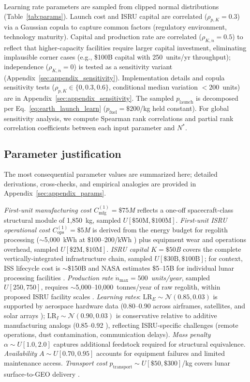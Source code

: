 \documentclass[preprint,12pt]{elsarticle}
\begin{document}
Learning rate parameters are sampled from clipped normal distributions (Table~\ref{tab:params}). Launch cost and ISRU capital are correlated ($\rho_{p,K} = 0.3$) via a Gaussian copula to capture common factors (regulatory environment, technology maturity). Capital and production rate are correlated ($\rho_{K,\dot{n}} = 0.5$) to reflect that higher-capacity facilities require larger capital investment, eliminating implausible corner cases (e.g., \$100B capital with 250~units/yr throughput); independence ($\rho_{K,\dot{n}} = 0$) is tested as a sensitivity variant (Appendix~\ref{sec:appendix_sensitivity}). Implementation details and copula sensitivity tests ($\rho_{p,K} \in \{0, 0.3, 0.6\}$, conditional median variation $<$200~units) are in Appendix~\ref{sec:appendix_sensitivity}. The sampled $p_{\mathrm{launch}}$ is decomposed per Eq.~\ref{eq:earth_launch_learn} ($p_{\mathrm{fuel}} = \$200$/kg held constant). For global sensitivity analysis, we compute Spearman rank correlations and partial rank correlation coefficients between each input parameter and $N^*$.

\subsection{Parameter justification}
\label{sec:param_justification}

The most consequential parameter values are summarized here; detailed derivations, cross-checks, and empirical analogies are provided in Appendix~\ref{sec:appendix_params}.

\emph{First-unit manufacturing cost $C_{\mathrm{mfg}}^{(1)} = \$75$M} reflects a one-off spacecraft-class structural module of 1{,}850~kg, sampled $U[\$50\text{M}, \$100\text{M}]$. \emph{First-unit ISRU operational cost $C_{\mathrm{ops}}^{(1)} = \$5$M} is derived from the energy budget for regolith processing ($\sim$5{,}000~kWh at \$100--200/kWh \cite{cilliers2023}) plus equipment wear and operations overhead, sampled $U[\$2\text{M}, \$10\text{M}]$. \emph{ISRU capital $K = \$50$B} covers the complete vertically-integrated infrastructure chain, sampled $U[\$30\text{B}, \$100\text{B}]$; for context, ISS lifecycle cost is $\sim$\$150B and NASA estimates \$5--15B for individual lunar processing facilities \cite{sanders2015,nasa2015handbook}. \emph{Production rate $\dot{n}_{\max} = 500$~units/year}, sampled $U[250, 750]$, requires $\sim$5{,}000--10{,}000~tonnes/year of raw regolith, within proposed ISRU facility scales \cite{sanders2015}. \emph{Learning rates}: $\mathrm{LR}_E \sim \mathcal{N}(0.85, 0.03)$ is supported by aerospace hardware data (0.80--0.90 across airframes, satellites, and solar arrays \cite{wright1936,wertz2011,nagy2013,argote1990}); $\mathrm{LR}_I \sim \mathcal{N}(0.90, 0.03)$ is conservative relative to additive manufacturing analogs (0.85--0.92 \cite{baumers2016}), reflecting ISRU-specific challenges (remote operations, dust contamination, communication delays). \emph{Mass penalty} $\alpha \sim U[1.0, 2.0]$ captures additional feedstock required for structural equivalence. \emph{Availability} $A \sim U[0.70, 0.95]$ accounts for equipment failures and limited maintenance access. \emph{Transport cost} $p_{\mathrm{transport}} \sim U[\$50, \$300]$/kg covers lunar surface-to-GEO delivery \cite{ishimatsu2016}.
\end{document}

